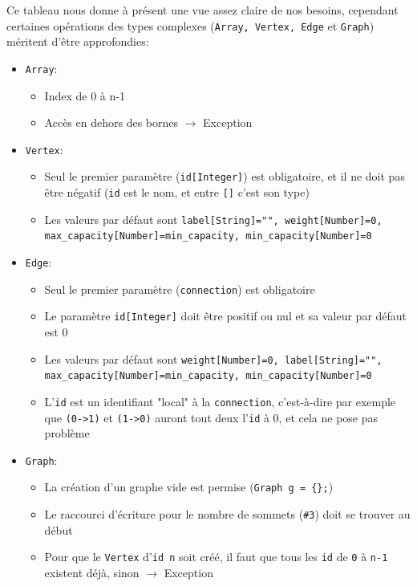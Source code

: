 \documentclass[french]{article}
\begin{document}
				Ce tableau nous donne à présent une vue assez claire de nos besoins, cependant certaines opérations des types complexes (\texttt{Array, Vertex, Edge} et \texttt{Graph}) méritent d'être approfondies:
				
				\begin{itemize}
					\item \texttt{Array}: 
					\begin{itemize}
						\item Index de 0 à n-1
						\item Accès en dehors des bornes $\rightarrow$ Exception
					\end{itemize}
					\item \texttt{Vertex}:
					\begin{itemize}
						\item Seul le premier paramètre (\texttt{id[Integer]}) est obligatoire, et il ne doit pas être négatif (\texttt{id} est le nom, et entre \texttt{[]} c'est son type)
						\item Les valeurs par défaut sont \texttt{label[String]="", weight[Number]=0, max\_capacity[Number]=min\_capacity, min\_capacity[Number]=0}
					\end{itemize}
					\item \texttt{Edge}: 
					\begin{itemize}
						\item Seul le premier paramètre (\texttt{connection}) est obligatoire
						\item Le paramètre \texttt{id[Integer]} doit être positif ou nul et sa valeur par défaut est 0
						\item Les valeurs par défaut sont \texttt{weight[Number]=0, label[String]="", max\_capacity[Number]=min\_capacity, min\_capacity[Number]=0}
						\item L'\texttt{id} est un identifiant "local" à la \texttt{connection}, c'est-à-dire par exemple que \texttt{(0->1)} et \texttt{(1->0)} auront tout deux l'\texttt{id} à 0, et cela ne pose pas problème
					\end{itemize}
					\item \texttt{Graph}: 
					\begin{itemize}
						\item La création d'un graphe vide est permise (\texttt{Graph g = \{\};})
						\item Le raccourci d'écriture pour le nombre de sommets (\texttt{\#3}) doit se trouver au début
						\item Pour que le \texttt{Vertex} d'\texttt{id n} soit créé, il faut que tous les \texttt{id} de \texttt{0} à \texttt{n-1} existent déjà, sinon $\rightarrow$ Exception 

\end{itemize}
\end{itemize}
\end{document}
